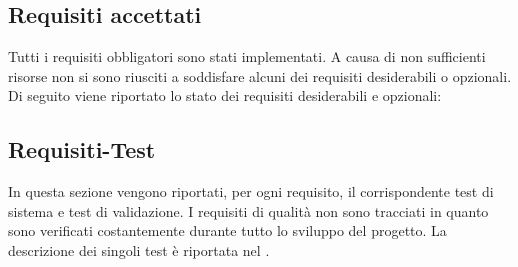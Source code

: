 	\subsection{Requisiti accettati} %
	\label{sub:requisiti_accettati}
	Tutti i requisiti obbligatori sono stati implementati. A causa di non sufficienti risorse non si sono riusciti a soddisfare alcuni dei requisiti desiderabili o opzionali. Di seguito viene riportato lo stato dei requisiti desiderabili e opzionali:
		

	\subsection{Requisiti-Test} %
	\label{sub:requisiti_test}
	In questa sezione vengono riportati, per ogni requisito, il corrispondente test di sistema e test di validazione. I requisiti di qualità non sono tracciati in quanto sono verificati costantemente durante tutto lo sviluppo del progetto. La descrizione dei singoli test è riportata nel \docNameVersionPdQ.
		

